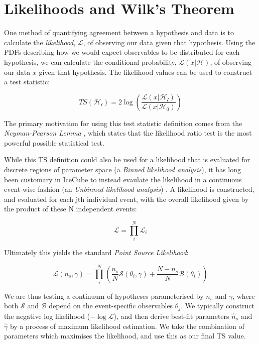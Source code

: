 \section{Likelihoods and Wilk's Theorem}

One method of quantifying agreement between a hypothesis and data is to calculate the \emph{likelihood}, $\mathcal{L}$, of observing our data given that hypothesis. Using the PDFs describing how we would expect observables to be distributed for each hypothesis, we can calculate the conditional probability, $\mathcal{L}(x | \mathcal{H})$, of observing our data $x$ given that hypothesis. The likelihood values can be used to construct a test statistic:

\begin{equation}
TS (\mathcal{H_{i}}) = 2 \log \left( \frac{\mathcal{L}(x | \mathcal{H_{i}})}{\mathcal{L}(x | \mathcal{H_{0}})} \right)
\label{eq:ts}
\end{equation}

The primary motivation for using this test statistic definition comes from the \emph{Neyman-Pearson Lemma} , which states that the likelihood ratio test is the most powerful possible statistical test. 

While this TS definition could also be used for a likelihood that is evaluated for discrete regions of parameter space (a \emph{Binned likelihood analysis}), it has long been customary in IceCube to instead evaulate the likelihood in a continuous event-wise fashion (an \emph{Unbinned likelihood analysis}) . A likelihood is constructed, and evaluated for each jth individual event, with the overall likelihood given by the product of these N independent events:

\begin{equation}
	\mathcal{L} = \prod_{i}^{N} \mathcal{L}_{i}
\end{equation}

Ultimately this yields the standard \emph{Point Source Likelihood}:

\begin{equation}
	\mathcal{L}(n_{s}, \gamma) = \prod_{i}^{N} \left(\frac{n_{s}}{N} \mathcal{S}(\theta_{i}, \gamma) + \frac{N - n_{s}}{N} \mathcal{B}(\theta_{i})  \right)
\label{eq:ps_llh}
\end{equation}

We are thus testing a continuum of hypotheses parameterised by $n_{s}$ and $\gamma$, where both $\mathcal{S}$ and $\mathcal{B}$ depend on the event-specific observables $\theta_{j}$. We typically construct the negative log likelihood ($- \log\mathcal{L}$), and then derive best-fit parameters $\hat{n}_{s}$ and  $\hat{\gamma}$ by a process of maximum likelihood estimation. We take the combination of parameters which maximises the likelihood, and use this as our final TS value. 

